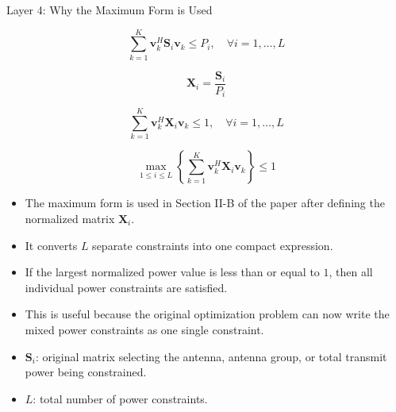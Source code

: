 \documentclass{beamer}
\begin{document}
\begin{frame}{Layer 4: Why the Maximum Form is Used}
\scriptsize

\[
    \sum_{k=1}^{K}\mathbf{v}_k^H\mathbf{S}_i\mathbf{v}_k \le P_i,
    \quad \forall i=1,\ldots,L
\]

\[
    \mathbf{X}_i=\frac{\mathbf{S}_i}{P_i}
\]

\[
    \sum_{k=1}^{K}\mathbf{v}_k^H\mathbf{X}_i\mathbf{v}_k \le 1,
    \quad \forall i=1,\ldots,L
\]

\[
    \max_{1\le i\le L}
    \left\{
    \sum_{k=1}^{K}\mathbf{v}_k^H\mathbf{X}_i\mathbf{v}_k
    \right\}
    \le 1
\]

\begin{itemize}
    \item The maximum form is used in Section II-B of the paper after defining the normalized matrix \(\mathbf{X}_i\).

    \item It converts \(L\) separate constraints into one compact expression.

    \item If the largest normalized power value is less than or equal to \(1\), then all individual power constraints are satisfied.

    \item This is useful because the original optimization problem can now write the mixed power constraints as one single constraint.

    \item \(\mathbf{S}_i\): original matrix selecting the antenna, antenna group, or total transmit power being constrained.
    \item \(L\): total number of power constraints.

\end{itemize}

\end{frame}
\end{document}
